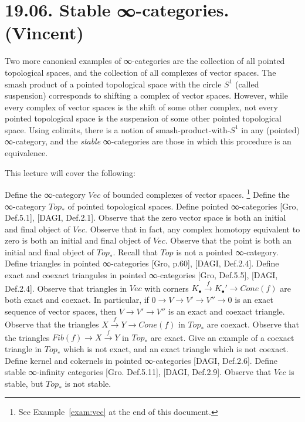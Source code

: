 \documentclass[a4paper]{amsart}
\numberwithin{figure}{section}
\theoremstyle{theorem}
\theoremstyle{definition}
\newcommand{\Top}{{Top}}
\newcommand{\pTop}{{Top}_\ast}
\newcommand{\grVec}{{Vec}}
\begin{document}

\section{19.06. Stable ∞-categories. (Vincent)} \label{stable}

Two more canonical examples of ∞-categories are the collection of all pointed topological spaces, and the collection of all complexes of vector spaces. The smash product of a pointed topological space with the circle $S^1$ (called suspension) corresponds to shifting a complex of vector spaces. %
However, while every complex of vector spaces is the shift of some other complex, not every pointed topological space is the suspension of some other pointed topological space. Using colimits, there is a notion of smash-product-with-$S^1$ in any (pointed) ∞-category, and the \emph{stable} ∞-categories are those in which this procedure is an equivalence.

This lecture will cover the following:

Define the ∞-category $\grVec$ of bounded complexes of vector spaces.%
\footnote{%
See Example~\ref{exam:vec} at the end of this document.
} %
Define the ∞-category $\pTop$ of pointed topological spaces. %
Define pointed ∞-categories [Gro, Def.5.1], [DAGI, Def.2.1]. %
Observe that the zero vector space is both an initial and final object of $\grVec$. %
Observe that in fact, any complex homotopy equivalent to zero is both an initial and final object of $\grVec$. %
Observe that the point is both an initial and final object of $\pTop$. %
Recall that $\Top$ is not a pointed ∞-category. %
Define triangles in pointed ∞-categories [Gro, p.60], [DAGI, Def.2.4]. %
Define exact and coexact triangules in pointed ∞-categories [Gro, Def.5.5], [DAGI, Def.2.4]. %
Observe that  triangles in $\grVec$ with corners $K_\bullet \stackrel{f}{\to} K_\bullet' \to Cone(f)$ are both exact and coexact. %
In particular, if $0 \to V \to V' \to V'' \to 0$ is an exact sequence of vector spaces, then $V \to V' \to V''$ is an exact and coexact triangle. %
Observe that the triangles $X \stackrel{f}{\to} Y \to Cone(f)$ in $\pTop$ are coexact. %
Observe that the triangles $Fib(f) \to X \stackrel{f}{\to} Y$ in $\pTop$ are exact. %
Give an example of a coexact triangle in $\pTop$ which is not exact, and an exact triangle which is not coexact. %
Define kernel and cokernels in pointed ∞-categories [DAGI, Def.2.6]. %
Define stable ∞-infinity categories [Gro. Def.5.11], [DAGI, Def.2.9]. %
Observe that $\grVec$ is stable, but $\pTop$ is not stable. %
\end{document}
